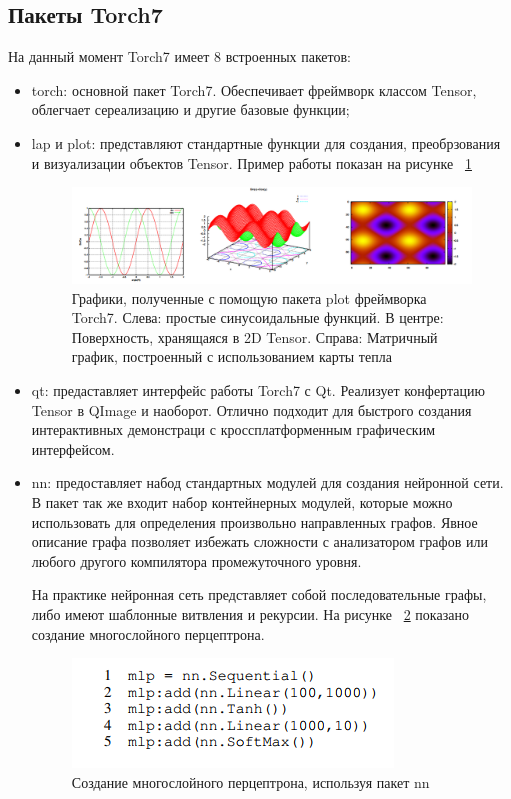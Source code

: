 \documentclass[a4paper,english,russian]{G2-105}
\begin{document}
\subsection{Пакеты Torch7}
\par На данный момент Torch7 имеет 8 встроенных пакетов:
\begin{itemize}
\item torch: основной пакет Torch7. Обеспечивает фреймворк классом Tensor, облегчает сереализацию и другие базовые функции;
\item lap и plot: представляют стандартные функции для создания, преобрзования и визуализации объектов Tensor. Пример работы показан на рисунке ~\ref{torch_plots}
\begin{figure}
    \includegraphics[width=\linewidth]{torch_plots.png}
    \caption{Графики, полученные с помощую пакета plot фреймворка Torch7. Слева: простые синусоидальные функций. В центре: Поверхность, хранящаяся в 2D Tensor. Справа: Матричный график, построенный с использованием карты тепла}
	\label{torch_plots}
\end{figure}
\item qt: предаставляет интерфейс работы Torch7 с Qt. Реализует конфертацию Tensor в QImage и наоборот. Отлично подходит для быстрого создания интерактивных демонстраци с кроссплатформенным графическим интерфейсом.
\item nn: предоставляет набод стандартных модулей для создания нейронной сети. В пакет так же входит набор контейнерных модулей, которые можно использовать для определения произвольно направленных графов. Явное описание графа позволяет избежать сложности с анализатором графов или любого другого компилятора промежуточного уровня.
\par На практике нейронная сеть представляет собой последовательные графы, либо имеют шаблонные витвления и рекурсии. На рисунке ~\ref{nn_create} показано создание многослойного перцептрона.
\begin{figure}
    \includegraphics[width=0.3\paperheight]{nn_create.png}
    \caption{Создание многослойного перцептрона, используя пакет nn}
	\label{nn_create}
\end{figure}
\end{itemize}
\end{document}
